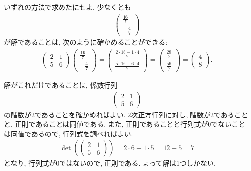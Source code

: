 \begin{checkanswer}%
  いずれの方法で求めたにせよ,
  少なくとも
  \begin{align*}
    \begin{pmatrix}
      \frac{16}{7}\\-\frac{4}{7}
    \end{pmatrix}
  \end{align*}
  が解であることは, 次のように確かめることができる:
  \begin{align*}
    \begin{pmatrix}
      2&1\\5&6
    \end{pmatrix}
    \begin{pmatrix}
      \frac{16}{7}\\-\frac{4}{7}
    \end{pmatrix}
    =
    \begin{pmatrix}
      \frac{2\cdot 16-1\cdot 4}{7}\\\frac{5\cdot 16-6\cdot 4}{7}
    \end{pmatrix}
    =
    \begin{pmatrix}
      \frac{28}{7}\\\frac{56}{7}
    \end{pmatrix}
    =
    \begin{pmatrix}
      4\\8
    \end{pmatrix}.
  \end{align*}
\end{checkanswer}
\begin{checkanswer}%
  解がこれだけであることは,
  係数行列
  \begin{align*}
    \begin{pmatrix}
      2&1\\
      5&6
    \end{pmatrix}
  \end{align*}
  の階数が$2$であることを確かめればよい.
  $2$次正方行列に対し,
  階数が$2$であることと, 正則であることは同値である.
  また, 正則であることと行列式が$0$でないことは同値であるので,
  行列式を調べればよい.
  \begin{align*}
    \det(
    \begin{pmatrix}
      2&1\\
      5&6
    \end{pmatrix})
    =2\cdot 6 - 1\cdot 5=12-5=7
  \end{align*}
  となり, 行列式が$0$ではないので, 正則である.
  よって解は1つしかない.
\end{checkanswer}



